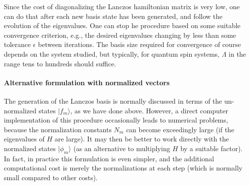 \documentclass[draft,numberedheadings]{aipproc}
\begin{document}
Since the cost of diagonalizing the Lanczos hamiltonian matrix is very low, one can do that after each new basis state has been generated, 
and follow the evolution of the eigenvalues. One can stop he procedure based on some suitable convergence criterion, e.g., the desired eigenvalues 
changing by less than some tolerance $\epsilon$ between iterations. The basis size required for convergence of course depends on the system studied, but 
typically, for quantum spin systems, $\Lambda$ in the range tens to hundreds should suffice.

\paragraph{Alternative formulation with normalized vectors}

The generation of  the Lanczos basis is normally discussed in terms of the un-normalized states $|f_m\rangle$, as we have done above. However, a direct computer
implementation of this procedure occasionally leads to numerical problems, because the normalization constants $N_m$ can become exceedingly large (if the eigenvalues 
of $H$ are large). It may then be better to work directly with the normalized states $|\phi_m\rangle$ (as an alternative to multiplying $H$ by a suitable factor). 
In fact, in practice this formulation is even simpler, and the additional computational cost is merely the normalizations at each step (which is normally small 
compared to other costs).
\end{document}

